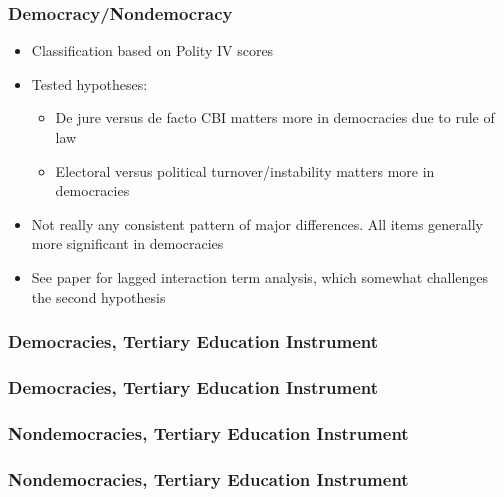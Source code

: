 \documentclass{beamer}
\begin{document}
    \begin{frame}
        \frametitle{Democracy/Nondemocracy}
        \begin{itemize}
            \item Classification based on Polity IV scores
            \item Tested hypotheses:
            \begin{itemize}
                \item De jure versus de facto CBI matters more in democracies due to rule of law
                \item Electoral versus political turnover/instability matters more in democracies
            \end{itemize}
            \item Not really any consistent pattern of major differences. All items generally more significant in democracies
            \item See paper for lagged interaction term analysis, which somewhat challenges the second hypothesis
        \end{itemize}
    \end{frame}

    \begin{frame}
        \frametitle{Democracies, Tertiary Education Instrument}
        {
            \let\oldcentering\centering
            \renewcommand\centering{\tiny\oldcentering}
            
        }
    \end{frame}

    \begin{frame}
        \frametitle{Democracies, Tertiary Education Instrument}
        {
            \let\oldcentering\centering
            \renewcommand\centering{\tiny\oldcentering}
            
        }
    \end{frame}

    \begin{frame}
        \frametitle{Nondemocracies, Tertiary Education Instrument}
        {
            \let\oldcentering\centering
            \renewcommand\centering{\tiny\oldcentering}
            
        }
    \end{frame}

    \begin{frame}
        \frametitle{Nondemocracies, Tertiary Education Instrument}
        {
            \let\oldcentering\centering
            \renewcommand\centering{\tiny\oldcentering}
            
        }
    \end{frame}
\end{document}
